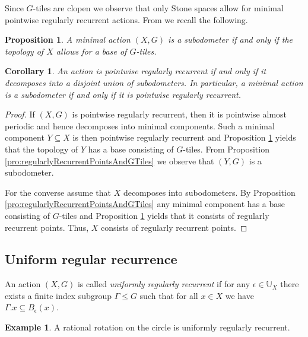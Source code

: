 \documentclass[12pt, reqno]{amsart}
\newtheorem{proposition}[theorem]{Proposition}
\newtheorem{corollary}[theorem]{Corollary}
\theoremstyle{definition}
\newtheorem{example}[theorem]{Example}
\theoremstyle{remark}
\numberwithin{equation}{section}
\theoremstyle{theorem}
\theoremstyle{remark}
\begin{document}
Since $G$-tiles are clopen we observe that only Stone spaces allow for minimal pointwise regularly recurrent actions. 
From \cite[Theorem~3.6]{cortez2026minimal} we recall the following. 

\begin{proposition} \cite[Theorem~3.6]{cortez2026minimal}
\label{pro:characterizationGTiles} 
    A minimal action $(X,G)$ is a subodometer if and only if the topology of $X$ allows for a base of $G$-tiles.  
\end{proposition}

\begin{corollary}
\label{cor:characterizationSubodometersViaRegularRecurrence}
    An action is pointwise regularly recurrent if and only if it decomposes into a disjoint union of subodometers. 
    In particular, a minimal action is a subodometer if and only if it is pointwise regularly recurrent. 
\end{corollary}
\begin{proof}
    If $(X,G)$ is pointwise regularly recurrent, then it is pointwise almost periodic and hence decomposes into minimal components. 
    Such a minimal component $Y\subseteq X$ is then pointwise regularly recurrent and Proposition \ref{pro:characterizationGTiles} yields that the topology of $Y$ has a base consisting of $G$-tiles. 
    From Proposition \ref{pro:regularlyRecurrentPointsAndGTiles} we observe that $(Y,G)$ is a subodometer. 

    For the converse assume that $X$ decomposes into subodometers. 
    By Proposition \ref{pro:regularlyRecurrentPointsAndGTiles} any minimal component has a base consisting of $G$-tiles and Proposition \ref{pro:characterizationGTiles} yields that it consists of regularly recurrent points. Thus, $X$ consists of regularly recurrent points. 
\end{proof}



\subsection{Uniform regular recurrence}
\label{subsec:RegularRecurrence_UniformRegularRecurrence}
An action $(X,G)$ is called \emph{uniformly regularly recurrent} if for any $\epsilon\in \mathbb{U}_X$ there exists a finite index subgroup $\Gamma\leq G$ such that for all $x\in X$ we have $\Gamma.x\subseteq B_\epsilon(x)$. 

\begin{example}
    A rational rotation on the circle is uniformly regularly recurrent.
\end{example}
\end{document}
